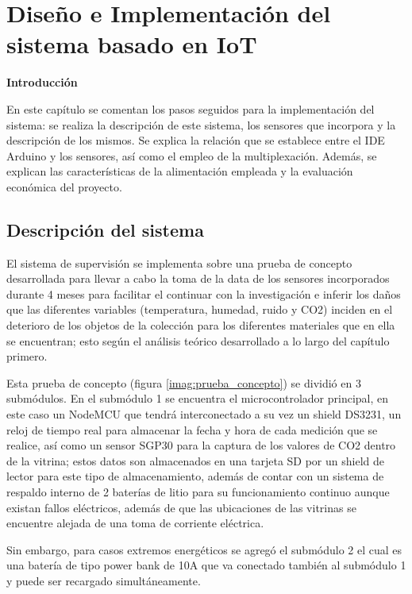 \chapter{Diseño e Implementación del sistema basado en IoT}\label{cap: }

        \textbf{\Large Introducción}\newline
        
    En este capítulo se comentan los pasos seguidos para la implementación del sistema: se realiza la descripción de este sistema, los sensores que incorpora y la descripción de los mismos. 
    Se explica la relación que se establece entre el IDE Arduino y los sensores, así como el empleo de la multiplexación. Además, se explican las características de la alimentación empleada y la evaluación económica del proyecto.
    
\section{Descripción del sistema} \label{descripcion_sistema}

    El sistema de supervisión se implementa sobre una prueba de concepto desarrollada para llevar a cabo la toma de la data de los sensores incorporados durante 4 meses para facilitar el continuar con la investigación e inferir los daños que las diferentes variables (temperatura, humedad, ruido y CO2) inciden en el deterioro de los objetos de la colección para los diferentes materiales que en ella se encuentran; esto según el análisis teórico desarrollado a lo largo del capítulo primero.

    Esta prueba de concepto (figura \ref{imag:prueba_concepto}) se dividió en 3 submódulos. En el submódulo 1 se encuentra el microcontrolador principal, en este caso un NodeMCU que tendrá interconectado a su vez un shield DS3231, un reloj de tiempo real para almacenar la fecha y hora de cada medición que se realice, así como un sensor SGP30 para la captura de los valores de CO2 dentro de la vitrina; estos datos son almacenados en una tarjeta SD por un shield de lector para este tipo de almacenamiento, además de contar con un sistema de respaldo interno de 2 baterías de litio para su funcionamiento continuo aunque existan fallos eléctricos, además de que las ubicaciones de las vitrinas se encuentre alejada de una toma de corriente eléctrica.

    Sin embargo, para casos extremos energéticos se agregó el submódulo 2 el cual es una batería de tipo power bank de 10A que va conectado también al submódulo 1 y puede ser recargado simultáneamente.

